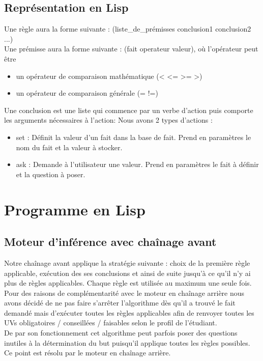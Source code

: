 \documentclass[a4paper, 12pt, final]{article}
\begin{document}
\subsection{Représentation en Lisp}
Une règle aura la forme suivante :
(liste\_de\_prémisses conclusion1 conclusion2 ...)
\vspace{1em}\\
Une prémisse aura la forme suivante : (fait operateur valeur), où l'opérateur peut être
\begin{itemize}
\item un opérateur de comparaison mathématique (<
  <= >= >)
\item un opérateur de comparaison générale (= !=)
\end{itemize}
\vspace{1em}
Une conclusion est une liste qui commence par un verbe d'action puis comporte les arguments nécessaires à l'action:
Nous avons 2 types d'actions :
\begin{itemize}
\item set : Définit la valeur d'un fait dans la base de fait. Prend en paramètres le nom du fait et la valeur à stocker.
\item ask : Demande à l'utilisateur une valeur. Prend en paramètres le fait à définir et la question à poser.
\end{itemize}

\section{Programme en Lisp}
\subsection{Moteur d'inférence avec chaînage avant}
Notre chaînage avant applique la stratégie suivante : choix de la première
règle applicable, exécution des ses conclusions et ainsi de suite
jusqu'à ce qu'il n'y ai plus de règles applicables. Chaque règle est utilisée au maximum une seule fois.\\
Pour des raisons de complémentarité avec le moteur en chaînage arrière
nous avons décidé de ne pas faire s'arrêter l'algorithme dès qu'il a
trouvé le fait demandé mais d'exécuter toutes les règles applicables
afin de renvoyer toutes les UVs obligatoires / conseillées / faisables
selon le profil de l'étudiant.\\
De par son fonctionnement cet algorithme peut parfois poser des
questions inutiles à la détermination du but puisqu'il applique toutes les règles possibles. Ce
point est résolu par le moteur en chaînage arrière.
\end{document}
